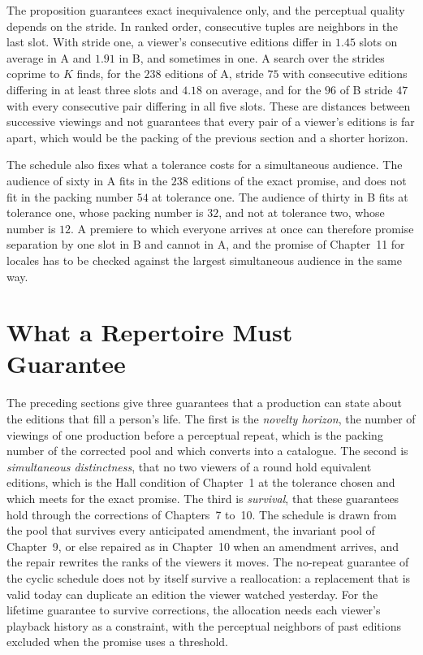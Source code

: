 \documentclass[11pt,twoside,openright]{book}
\theoremstyle{plain}
\theoremstyle{definition}
\theoremstyle{remark}
\begin{document}
The proposition guarantees exact inequivalence only, and the perceptual quality depends on the stride. In ranked order, consecutive tuples are neighbors in the last slot. With stride one, a viewer's consecutive editions differ in $1.45$ slots on average in A and $1.91$ in B, and sometimes in one. A search over the strides coprime to $K$ finds, for the $238$ editions of A, stride $75$ with consecutive editions differing in at least three slots and $4.18$ on average, and for the $96$ of B stride $47$ with every consecutive pair differing in all five slots. These are distances between successive viewings and not guarantees that every pair of a viewer's editions is far apart, which would be the packing of the previous section and a shorter horizon.

The schedule also fixes what a tolerance costs for a simultaneous audience. The audience of sixty in A fits in the $238$ editions of the exact promise, and does not fit in the packing number $54$ at tolerance one. The audience of thirty in B fits at tolerance one, whose packing number is $32$, and not at tolerance two, whose number is $12$. A premiere to which everyone arrives at once can therefore promise separation by one slot in B and cannot in A, and the promise of Chapter~11 for locales has to be checked against the largest simultaneous audience in the same way.

\section{What a Repertoire Must Guarantee}\label{sec:guarantee13}

The preceding sections give three guarantees that a production can state about the editions that fill a person's life. The first is the \emph{novelty horizon}, the number of viewings of one production before a perceptual repeat, which is the packing number of the corrected pool and which  converts into a catalogue. The second is \emph{simultaneous distinctness}, that no two viewers of a round hold equivalent editions, which is the Hall condition of Chapter~1 at the tolerance chosen and which  meets for the exact promise. The third is \emph{survival}, that these guarantees hold through the corrections of Chapters~7 to~10. The schedule is drawn from the pool that survives every anticipated amendment, the invariant pool of Chapter~9, or else repaired as in Chapter~10 when an amendment arrives, and the repair rewrites the ranks of the viewers it moves. The no-repeat guarantee of the cyclic schedule does not by itself survive a reallocation: a replacement that is valid today can duplicate an edition the viewer watched yesterday. For the lifetime guarantee to survive corrections, the allocation needs each viewer's playback history as a constraint, with the perceptual neighbors of past editions excluded when the promise uses a threshold.
\end{document}

